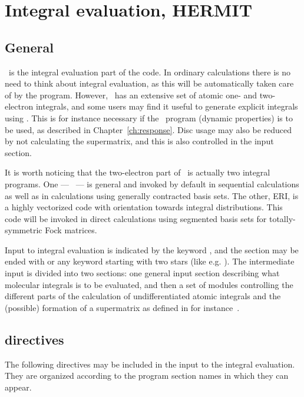 \chapter{Integral evaluation, HERMIT}\label{ch:hermit}

\section{General}\label{sec:herminf}

    \her\ is the integral evaluation part of the code. In ordinary
calculations there is no need to think about integral evaluation, as
this will be automatically taken care of by the program. However,
\her\ has an extensive set of atomic one- and two-electron
integrals,
and some users may find it useful to generate explicit integrals using
\her . This is for instance necessary if the \resp\ program (dynamic
properties) is to be
used, as described in Chapter~\ref{ch:response}. Disc usage may also
be reduced by not calculating the
supermatrix, and this is also controlled in the
 input section.

It is worth noticing that the two-electron part of \her\ is actually
two integral programs. One --- \her\ --- is general and invoked by default in
sequential calculations as well as in calculations using generally
contracted basis sets. The other, {\sc ERI}, is a highly vectorized
code with orientation towards integral distributions. This code will
be invoked in direct calculations using segmented basis sets for
totally-symmetric Fock matrices.

    Input to integral evaluation is
indicated by the keyword , and the section may be
ended with  or any keyword starting with two stars
(like e.g. ). The intermediate input is
divided into two sections: one general input section describing
what molecular integrals is to be evaluated, and then a set of
modules controlling the different parts of the calculation of
undifferentiated atomic integrals and the (possible) formation of
a supermatrix as defined in for instance~\cite{pemsjaahborjcp74}.

\section{ directives}\label{sec:herinp}

          The following directives may be included in the input to
the integral evaluation.  They are organized according to the program
section names in which they can appear.

